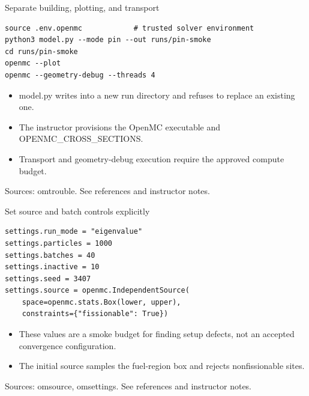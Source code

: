 \documentclass[aspectratio=169,11pt]{beamer}
\begin{document}
\begin{frame}[t,fragile]{Separate building, plotting, and transport}
\begin{lstlisting}
source .env.openmc            # trusted solver environment
python3 model.py --mode pin --out runs/pin-smoke
cd runs/pin-smoke
openmc --plot
openmc --geometry-debug --threads 4
\end{lstlisting}
\fontsize{10.5}{12.5}\selectfont
\begin{itemize}\setlength{\itemsep}{2mm}
\item model.py writes into a new run directory and refuses to replace an existing one.
\item The instructor provisions the OpenMC executable and OPENMC\_CROSS\_SECTIONS.
\item Transport and geometry-debug execution require the approved compute budget.
\end{itemize}
\vfill{\fontsize{6.5}{8}\selectfont\color{UTgray} Sources: omtrouble. See references and instructor notes.\par}
\end{frame}
\begin{frame}[t,fragile]{Set source and batch controls explicitly}
\begin{lstlisting}
settings.run_mode = "eigenvalue"
settings.particles = 1000
settings.batches = 40
settings.inactive = 10
settings.seed = 3407
settings.source = openmc.IndependentSource(
    space=openmc.stats.Box(lower, upper),
    constraints={"fissionable": True})
\end{lstlisting}
\fontsize{10.5}{12.5}\selectfont
\begin{itemize}\setlength{\itemsep}{2mm}
\item These values are a smoke budget for finding setup defects, not an accepted convergence configuration.
\item The initial source samples the fuel-region box and rejects nonfissionable sites.
\end{itemize}
\vfill{\fontsize{6.5}{8}\selectfont\color{UTgray} Sources: omsource, omsettings. See references and instructor notes.\par}
\end{frame}
\end{document}
